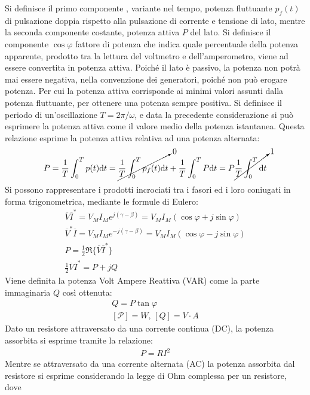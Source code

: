 \documentclass{article}
\newcommand{\df}{\mathrm{d}}
\numberwithin{equation}{subsection}
\begin{document}
Si definisce il primo componente , variante nel tempo, potenza fluttuante $p_f(t)$ di pulsazione doppia rispetto alla pulsazione di corrente e tensione di lato, mentre la seconda 
componente costante, potenza attiva $P$ del lato. Si definisce il componente $\cos\varphi$ fattore di potenza che indica quale percentuale della potenza apparente, prodotto 
tra la lettura del voltmetro e dell'amperometro, viene ad essere convertita in potenza attiva. 
Poiché il lato è passivo, la potenza non potrà mai essere negativa, nella convenzione dei generatori, poiché non può erogare potenza. Per cui la potenza attiva corrisponde 
ai minimi valori assunti dalla potenza fluttuante, per ottenere una potenza sempre positiva. 
Si definisce il periodo di un'oscillazione $T=2\pi/\omega$, e data la precedente considerazione si può esprimere la potenza attiva come il valore medio della potenza 
istantanea. Questa relazione esprime la potenza attiva relativa ad una potenza alternata:
\begin{gather*}
    P=\displaystyle\frac{1}{T}\int_0^Tp(t)\df t=\cancelto{0}{\frac{1}{T}\int_0^Tp_f(t)\df t}+\frac{1}{T}\int_0^TP\df t=P\cancelto{1}{\frac{1}{T}\int_0^T\df t}
\end{gather*}
Si possono rappresentare i prodotti incrociati tra i fasori ed i loro coniugati in forma trigonometrica, mediante le formule di Eulero: 
\begin{gather*}
    \overline{V}\overline{I}^*=V_MI_Me^{j(\gamma-\beta)}=V_MI_M\left(\cos\varphi+j\sin\varphi\right)\\
    \overline{V}^*\overline{I}=V_MI_Me^{-j(\gamma-\beta)}=V_MI_M\left(\cos\varphi-j\sin\varphi\right)\\
    P=\displaystyle\frac{1}{2}\Re\{\overline{V}\overline{I}^*\}\\
    \displaystyle\frac{1}{2}\overline{V}\overline{I}^*=P+jQ
\end{gather*}
Viene definita la potenza Volt Ampere Reattiva (VAR) come la parte immaginaria $Q$ così ottenuta: 
\begin{gather*}
    Q=P\tan\varphi\\
    [\mathcal{P}]=W,\,[Q]=V\cdot A
\end{gather*}
Dato un resistore attraversato da una corrente continua (DC), la potenza assorbita si esprime tramite la relazione:
\begin{gather*}
    P=RI^2
\end{gather*}
Mentre se attraversato da una corrente alternata (AC) la potenza assorbita dal resistore si esprime considerando la legge di Ohm complessa per un resistore, dove 
\end{document}
